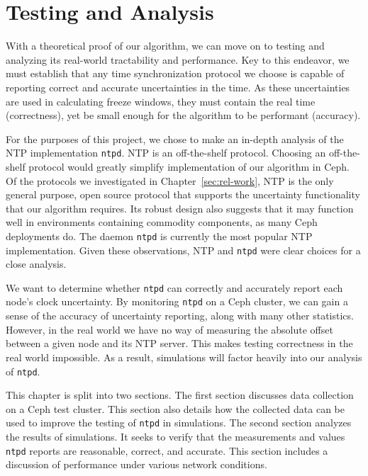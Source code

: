 \chapter{Testing and Analysis}
\label{sec:results}

With a theoretical proof of our algorithm, we can move on to
testing and analyzing its real-world tractability and performance. 
Key to this endeavor, we must establish that any time synchronization
protocol we choose is capable of reporting correct and accurate uncertainties
in the time. As these uncertainties are used in calculating freeze windows,
they must contain the real time (correctness), yet be small enough for the algorithm to 
be performant (accuracy). 

For the purposes of this project, we chose to make an in-depth analysis of 
the NTP implementation \texttt{ntpd}. NTP is an off-the-shelf protocol. Choosing
an off-the-shelf protocol would greatly simplify implementation of our 
algorithm in Ceph. Of the protocols we investigated in Chapter~\ref{sec:rel-work}, 
NTP is the only general purpose, open source protocol that supports the 
uncertainty functionality that our algorithm requires. Its robust design
also suggests that it may function well in environments containing commodity 
components, as many Ceph deployments do. The daemon \texttt{ntpd} 
is currently the most popular NTP implementation. Given these observations, 
NTP and \texttt{ntpd} were clear choices for a close analysis.

We want to determine whether \texttt{ntpd} can 
correctly and accurately report each node's clock uncertainty. By monitoring 
\texttt{ntpd} on a Ceph cluster, we can gain a sense of the accuracy of
uncertainty reporting, along with many other statistics. However,
in the real world we have no way of measuring the absolute offset between
a given node and its NTP server. This makes testing correctness in the 
real world impossible. As a result, simulations will factor heavily into 
our analysis of \texttt{ntpd}.

This chapter is split into two sections. The first section discusses data collection 
on a Ceph test cluster. This section also details how the collected data
can be used to improve the testing of \texttt{ntpd} in simulations.
The second section analyzes the results of simulations. It seeks to verify that 
the measurements and values \texttt{ntpd} reports are reasonable, correct, and
accurate. This section includes a discussion of performance under various network conditions.  

